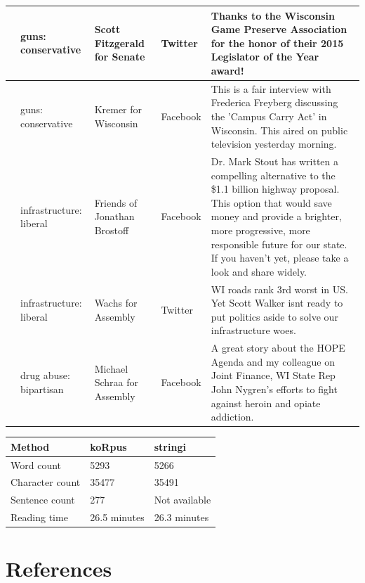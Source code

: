 \documentclass[12pt,]{article}
\begin{document}
\begin{longtable}[t]{>{\raggedright\arraybackslash}p{.65in}|>{\raggedright\arraybackslash}p{1in}|>{\raggedright\arraybackslash}p{1in}|>{\raggedright\arraybackslash}p{.7in}|>{\raggedright\arraybackslash}p{2.5in}}
\hline
8 & guns: conservative & Scott Fitzgerald for Senate & Twitter & Thanks to the Wisconsin Game Preserve Association for the honor of their 2015 Legislator of the Year award!\\
\hline
9 & guns: conservative & Kremer for Wisconsin & Facebook & This is a fair interview with Frederica Freyberg discussing the 'Campus Carry Act' in Wisconsin.  This aired on public television yesterday morning.\\
\hline
10 & infrastructure: liberal & Friends of Jonathan Brostoff & Facebook & Dr. Mark Stout has written a compelling alternative to the \$1.1 billion highway proposal. This option that would save money and provide a brighter, more progressive, more responsible future for our state. If you haven't yet, please take a look and share widely.\\
\hline
11 & infrastructure: liberal & Wachs for Assembly & Twitter & WI roads rank 3rd worst in US. Yet Scott Walker isnt ready to put politics aside to solve our infrastructure woes.\\
\hline
12 & drug abuse: bipartisan & Michael Schraa for Assembly & Facebook & A great story about the HOPE Agenda and my colleague on Joint Finance, WI State Rep John Nygren's efforts to fight against heroin and opiate addiction.\\
\hline
\end{longtable}

\begin{tabular}{l|l|l}
\hline
Method & koRpus & stringi\\
\hline
Word count & 5293 & 5266\\
\hline
Character count & 35477 & 35491\\
\hline
Sentence count & 277 & Not available\\
\hline
Reading time & 26.5 minutes & 26.3 minutes\\
\hline
\end{tabular}

\newpage

\hypertarget{references}{%
\section*{References}\label{references}}
\end{document}
